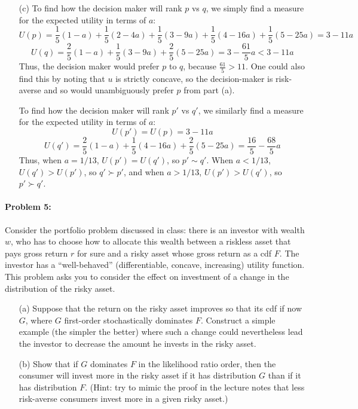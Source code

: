 \documentclass[12pt]{article}
\begin{document}
\begin{itemize}
    \item[(c)] To find how the decision maker will rank $p$ vs $q$, we simply find a measure for the expected utility in terms of $a$:
    \[
    U(p) = \frac{1}{5}(1 - a) +  \frac{1}{5}(2 - 4a) +  \frac{1}{5}(3 - 9a) +  \frac{1}{5}(4 - 16a) +  \frac{1}{5}(5 - 25a) = 3 - 11a
    \]
    \[
    U(q) = \frac{2}{5}(1-a) + \frac{1}{5}(3 - 9a) + \frac{2}{5}(5 - 25a) = 3 - \frac{61}{5}a < 3 - 11a
    \]
    Thus, the decision maker would prefer $p$ to $q$, because $\frac{61}{5} > 11$. One could also find this by noting that $u$ is strictly concave, so the decision-maker is risk-averse and so would unambiguously prefer $p$ from part (a).

    \medskip

    To find how the decision maker will rank $p'$ vs $q'$, we similarly find a measure for the expected utility in terms of $a$:
    \[
    U(p') = U(p) = 3 - 11a
    \]
    \[
    U(q') = \frac{2}{5}(1 - a) + \frac{1}{5}(4 - 16a) + \frac{2}{5}(5 - 25a) = \frac{16}{5} - \frac{68}{5}a
    \]
    Thus, when $a = 1/13$, $U(p') = U(q')$, so $p' \sim q'$. When $a < 1/13$, $U(q') > U(p')$, so $q' \succ p'$, and when $a > 1/13$, $U(p') > U(q')$, so $p' \succ q'$.
\end{itemize}

\paragraph{Problem 5:} Consider the portfolio problem discussed in class: there is an investor with wealth $w$, who has to choose how to allocate this wealth between a riskless asset that pays gross return $r$ for sure and a risky asset whose gross return as a cdf $F$. The investor has a ``well-behaved'' (differentiable, concave, increasing) utility function. This problem asks you to consider the effect on investment of a change in the distribution of the risky asset. 
\begin{itemize}
    \item[(a)] Suppose that the return on the risky asset improves so that its cdf if now $G$, where $G$ first-order stochastically dominates $F$. Construct a simple example (the simpler the better) where such a change could nevertheless lead the investor to decrease the amount he invests in the risky asset.

    \item[(b)] Show that if $G$ dominates $F$ in the likelihood ratio order, then the consumer will invest more in the risky asset if it has distribution $G$ than if it has distribution $F$. (Hint: try to mimic the proof in the lecture notes that less risk-averse consumers invest more in a given risky asset.)
\end{itemize}
\end{document}
